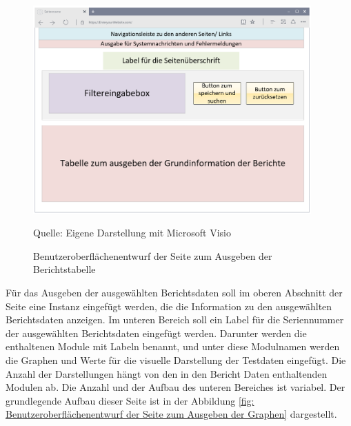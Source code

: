\begin{figure}[H]
    \centering
    \includegraphics[width=0.95\textwidth]{Grafiken/Overlay_Tabellenseite}
    \caption{Benutzeroberflächenentwurf der Seite zum Ausgeben der Berichtstabelle}
    \label{fig: Benutzeroberflächenentwurf der Seite zum Ausgeben der Berichtstabelle}
    {Quelle: Eigene Darstellung mit Microsoft Visio}
\end{figure}

Für das Ausgeben der ausgewählten Berichtsdaten soll im oberen Abschnitt der Seite eine Instanz
eingefügt werden, die die Information zu den ausgewählten Berichtsdaten anzeigen.
Im unteren Bereich soll ein Label für die Seriennummer der ausgewählten Berichtsdaten eingefügt
werden.
Darunter werden die enthaltenen Module mit Labeln benannt, und unter diese Modulnamen werden
die Graphen und Werte für die visuelle Darstellung der Testdaten eingefügt. Die Anzahl der Darstellungen
hängt von den in den Bericht Daten enthaltenden Modulen ab. Die Anzahl und der Aufbau des unteren
Bereiches ist variabel. Der grundlegende Aufbau dieser Seite ist in der Abbildung \ref{fig: Benutzeroberflächenentwurf der Seite zum Ausgeben der Graphen} dargestellt.

